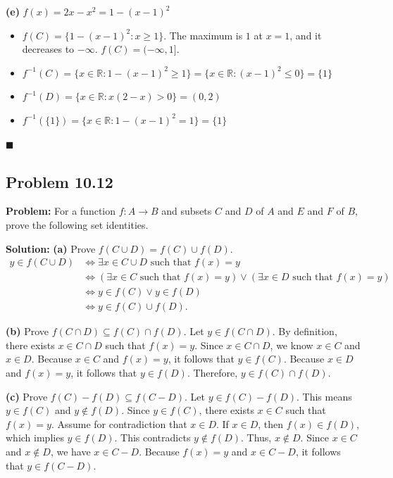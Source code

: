 \documentclass[11pt, a4paper]{article}
\theoremstyle{definition}
\theoremstyle{remark}
\newcommand{\R}{\mathbb{R}}
\begin{document}
\textbf{(e)} $f(x) = 2x - x^2 = 1 - (x-1)^2$
\begin{itemize}
    \item $f(C) = \{1 - (x-1)^2 : x \ge 1\}$. The maximum is $1$ at $x=1$, and it decreases to $-\infty$. $f(C) = (-\infty, 1]$.
    \item $f^{-1}(C) = \{x \in \R : 1 - (x-1)^2 \ge 1\} = \{x \in \R : (x-1)^2 \le 0\} = \{1\}$
    \item $f^{-1}(D) = \{x \in \R : x(2-x) > 0\} = (0, 2)$
    \item $f^{-1}(\{1\}) = \{x \in \R : 1 - (x-1)^2 = 1\} = \{1\}$
\end{itemize}
$\blacksquare$

\subsection{Problem 10.12}
\textbf{Problem:} For a function $f : A \to B$ and subsets $C$ and $D$ of $A$ and $E$ and $F$ of $B$, prove the following set identities.

\textbf{Solution:}
\textbf{(a)} Prove $f(C \cup D) = f(C) \cup f(D)$.
\begin{align*}
    y \in f(C \cup D) &\iff \exists x \in C \cup D \text{ such that } f(x) = y \\
    &\iff (\exists x \in C \text{ such that } f(x) = y) \lor (\exists x \in D \text{ such that } f(x) = y) \\
    &\iff y \in f(C) \lor y \in f(D) \\
    &\iff y \in f(C) \cup f(D).
\end{align*}

\textbf{(b)} Prove $f(C \cap D) \subseteq f(C) \cap f(D)$.
Let $y \in f(C \cap D)$. By definition, there exists $x \in C \cap D$ such that $f(x) = y$.
Since $x \in C \cap D$, we know $x \in C$ and $x \in D$.
Because $x \in C$ and $f(x) = y$, it follows that $y \in f(C)$.
Because $x \in D$ and $f(x) = y$, it follows that $y \in f(D)$.
Therefore, $y \in f(C) \cap f(D)$.

\textbf{(c)} Prove $f(C) - f(D) \subseteq f(C - D)$.
Let $y \in f(C) - f(D)$. This means $y \in f(C)$ and $y \notin f(D)$.
Since $y \in f(C)$, there exists $x \in C$ such that $f(x) = y$.
Assume for contradiction that $x \in D$. If $x \in D$, then $f(x) \in f(D)$, which implies $y \in f(D)$. This contradicts $y \notin f(D)$.
Thus, $x \notin D$. Since $x \in C$ and $x \notin D$, we have $x \in C - D$.
Because $f(x) = y$ and $x \in C - D$, it follows that $y \in f(C - D)$.
\end{document}
